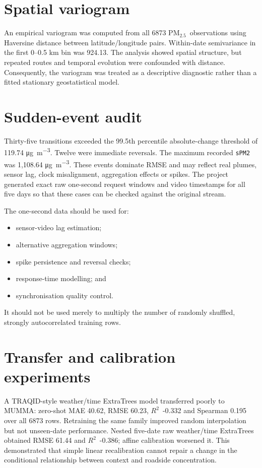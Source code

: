 \documentclass[11pt,a4paper,oneside]{report}
\newcommand{\pmtwo}{PM$_{2.5}$}
\newcommand{\ugm}{\si{\micro\gram\per\cubic\metre}}
\newcommand{\Rtwo}{$R^2$}
\begin{document}
\section{Spatial variogram}
An empirical variogram was computed from all \num{6873} \pmtwo\ observations using
Haversine distance between latitude/longitude pairs. Within-date semivariance
in the first 0--0.5 km bin was 924.13. The analysis showed spatial structure,
but repeated routes and temporal evolution were confounded with distance.
Consequently, the variogram was treated as a descriptive diagnostic rather than
a fitted stationary geostatistical model.

\section{Sudden-event audit}
Thirty-five transitions exceeded the 99.5th percentile absolute-change threshold
of 119.74 \ugm. Twelve were immediate reversals. The maximum recorded
\texttt{sPM2} was 1,108.64 \ugm. These events dominate RMSE and may reflect real
plumes, sensor lag, clock misalignment, aggregation effects or spikes. The
project generated exact raw one-second request windows and video timestamps for
all five days so that these cases can be checked against the original stream.

The one-second data should be used for:
\begin{itemize}
  \item sensor-video lag estimation;
  \item alternative aggregation windows;
  \item spike persistence and reversal checks;
  \item response-time modelling; and
  \item synchronisation quality control.
\end{itemize}
It should not be used merely to multiply the number of randomly shuffled,
strongly autocorrelated training rows.

\section{Transfer and calibration experiments}
A TRAQID-style weather/time ExtraTrees model transferred poorly to MUMMA:
zero-shot MAE 40.62, RMSE 60.23, \Rtwo\ -0.332 and Spearman 0.195 over all
\num{6873} rows. Retraining the same family improved random interpolation but
not unseen-date performance. Nested five-date raw weather/time ExtraTrees
obtained RMSE 61.44 and \Rtwo\ -0.386; affine calibration worsened it. This
demonstrated that simple linear recalibration cannot repair a change in the
conditional relationship between context and roadside concentration.
\end{document}
